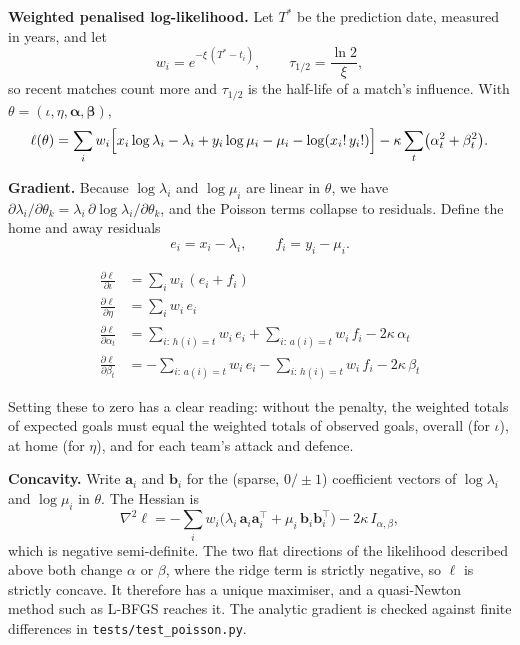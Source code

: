 \documentclass[12pt,a4paper]{article}
\begin{document}
\textbf{Weighted penalised log-likelihood.} Let $T^{*}$ be the prediction date, measured in years, and
let
\[
w_i=e^{-\xi\,(T^{*}-t_i)},\qquad \tau_{1/2}=\frac{\ln 2}{\xi},
\]
so recent matches count more and $\tau_{1/2}$ is the half-life of a match's influence. With
$\theta=(\iota,\eta,\boldsymbol\alpha,\boldsymbol\beta)$,
\[
\ell(\theta)=\sum_i w_i\Bigl[x_i\log\lambda_i-\lambda_i+y_i\log\mu_i-\mu_i-\log(x_i!\,y_i!)\Bigr]
-\kappa\sum_t\bigl(\alpha_t^2+\beta_t^2\bigr).
\]

\textbf{Gradient.} Because $\log\lambda_i$ and $\log\mu_i$ are linear in $\theta$, we have
$\partial\lambda_i/\partial\theta_k=\lambda_i\,\partial\log\lambda_i/\partial\theta_k$, and the
Poisson terms collapse to residuals. Define the home and away residuals
\[
e_i=x_i-\lambda_i,\qquad f_i=y_i-\mu_i .
\]

\begin{keybox}
\vspace{-0.6em}
\begin{align*}
\frac{\partial\ell}{\partial\iota}&=\sum_i w_i\,(e_i+f_i)\\[2pt]
\frac{\partial\ell}{\partial\eta}&=\sum_i w_i\,e_i\\[2pt]
\frac{\partial\ell}{\partial\alpha_t}&=\sum_{i:\,h(i)=t}w_i\,e_i+\sum_{i:\,a(i)=t}w_i\,f_i-2\kappa\,\alpha_t\\[2pt]
\frac{\partial\ell}{\partial\beta_t}&=-\sum_{i:\,a(i)=t}w_i\,e_i-\sum_{i:\,h(i)=t}w_i\,f_i-2\kappa\,\beta_t
\end{align*}
\vspace{-1.2em}
\end{keybox}

Setting these to zero has a clear reading: without the penalty, the weighted totals of expected
goals must equal the weighted totals of observed goals, overall (for $\iota$), at home (for $\eta$),
and for each team's attack and defence.

\textbf{Concavity.} Write $\mathbf a_i$ and $\mathbf b_i$ for the (sparse, $0/\pm1$) coefficient vectors
of $\log\lambda_i$ and $\log\mu_i$ in $\theta$. The Hessian is
\[
\nabla^2\ell=-\sum_i w_i\bigl(\lambda_i\,\mathbf a_i\mathbf a_i^{\top}+\mu_i\,\mathbf b_i\mathbf b_i^{\top}\bigr)-2\kappa\,I_{\alpha,\beta},
\]
which is negative semi-definite. The two flat directions of the likelihood described above both change
$\alpha$ or $\beta$, where the ridge term is strictly negative, so $\ell$ is strictly concave. It
therefore has a unique maximiser, and a quasi-Newton method such as L-BFGS reaches it. The analytic
gradient is checked against finite differences in
\texttt{tests/\allowbreak test\_poisson.py}.
\end{document}
